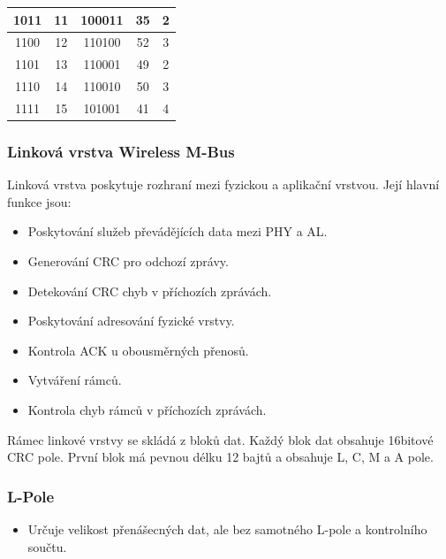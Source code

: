 \begin{table}[!ht]
\begin{tabular}{|c|c|c|c|c|}
1011             & 11                 & 100011              & 35                 & 2                          \\ \hline
1100             & 12                 & 110100              & 52                 & 3                          \\ \hline
1101             & 13                 & 110001              & 49                 & 2                          \\ \hline
1110             & 14                 & 110010              & 50                 & 3                          \\ \hline
1111             & 15                 & 101001              & 41                 & 4                          \\ \hline
\end{tabular}
\end{table}

\subsubsection{Linková vrstva Wireless M-Bus}

Linková vrstva poskytuje rozhraní mezi fyzickou a aplikační vrstvou. Její hlavní funkce jsou:
\begin{itemize}
	\item Poskytování služeb převádějících data mezi PHY a AL.
	\item Generování CRC pro odchozí zprávy.
	\item Detekování CRC chyb v příchozích zprávách.
	\item Poskytování adresování fyzické vrstvy.
	\item Kontrola ACK u obousměrných přenosů.
	\item Vytváření rámců.
	\item Kontrola chyb rámců v příchozích zprávách.
\end{itemize}

Rámec linkové vrstvy se skládá z bloků dat. Každý blok dat obsahuje 16bitové CRC pole.  První blok má pevnou délku 12 bajtů a obsahuje L, C, M a A pole.

\subsubsection{L-Pole}
\begin{itemize}
	\item Určuje velikost přenášecných dat, ale bez samotného L-pole a kontrolního součtu.	
\end{itemize}

